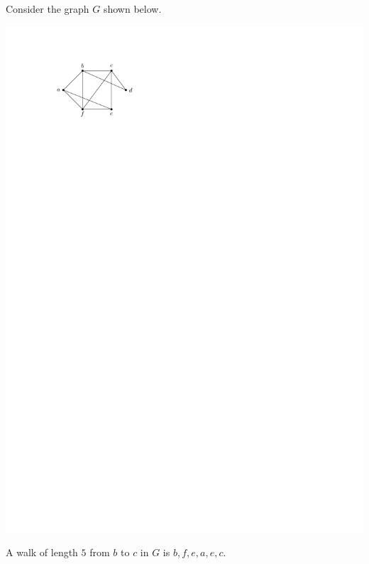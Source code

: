 \begin{Example}\label{ex:Walk}
Consider the graph $G$ shown below.

\begin{center}
\includegraphics{Images/Walks.pdf}
\end{center}
A walk of length $5$ from $b$ to $c$ in $G$ is $b, f, e, a, e, c$.


\end{Example}
